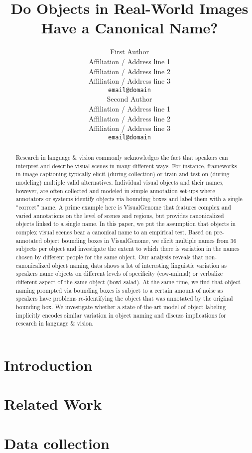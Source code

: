 \documentclass[11pt,a4paper]{article}
\title{Do Objects in Real-World Images Have a Canonical Name?}
\author{First Author \\
  Affiliation / Address line 1 \\
  Affiliation / Address line 2 \\
  Affiliation / Address line 3 \\
  {\tt email@domain} \\\And
  Second Author \\
  Affiliation / Address line 1 \\
  Affiliation / Address line 2 \\
  Affiliation / Address line 3 \\
  {\tt email@domain} \\}
\date{}
\begin{document}
\maketitle

\begin{abstract}
Research in language \& vision commonly acknowledges the fact that speakers can interpret and describe visual scenes in many different ways. For instance, frameworks in image captioning  typically elicit (during collection) or train and test on (during modeling) multiple valid alternatives. Individual visual objects and their names, however, are often collected and modeled in simple annotation set-ups where annotators or systems identify objects via bounding boxes and label them with a single ``correct'' name. A prime example here is VisualGenome that features complex and varied annotations on the level of scenes and regions, but provides canonicalized objects linked to a single name. In this paper, we put the assumption that objects in complex visual scenes bear a canonical name to an empirical test. Based on pre-annotated object bounding boxes in VisualGenome, we elicit multiple names from 36 subjects per object and investigate the extent to which there is variation in the names chosen by different people for the same object. Our analysis reveals that non-canonicalized object naming data shows a lot of interesting linguistic variation as speakers name objects on different levels of specificity (cow-animal) or verbalize different aspect of the same object (bowl-salad). At the same time, we find that object naming prompted via bounding boxes is subject to a certain amount of noise as speakers have problems re-identifying the object that was annotated by the original bounding box. We investigate whether a state-of-the-art model of object labeling implicitly encodes similar variation in object naming and discuss implications for research in language \& vision.
\end{abstract}

\section{Introduction}


\section{Related Work}
\label{sec:relwork}


\section{Data collection}
\label{sec:data}

\end{document}

